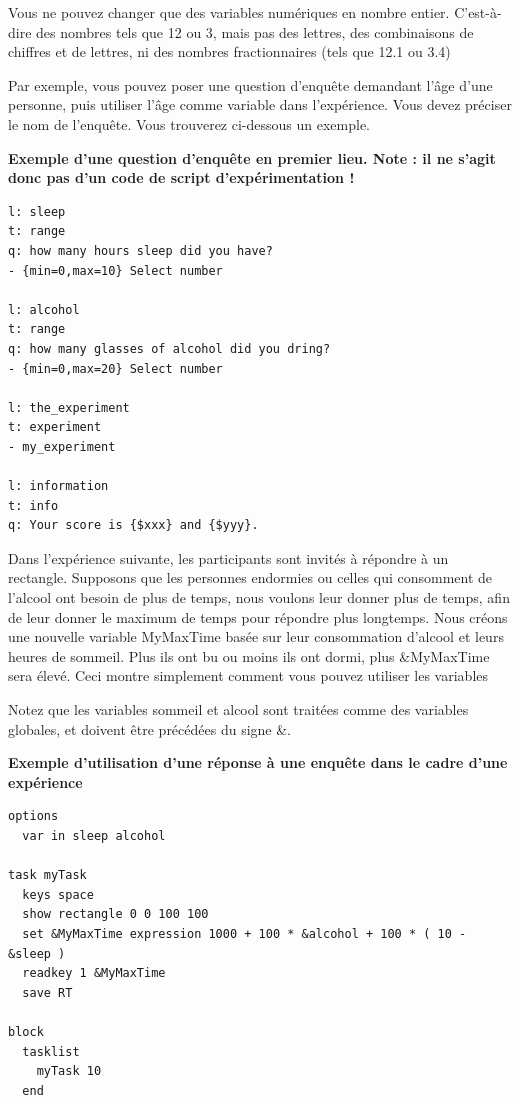 \documentclass[
]{book}
\begin{document}
Vous ne pouvez changer que des variables numériques en nombre entier.
C'est-à-dire des nombres tels que 12 ou 3, mais pas des lettres, des
combinaisons de chiffres et de lettres, ni des nombres fractionnaires
(tels que 12.1 ou 3.4)

Par exemple, vous pouvez poser une question d'enquête demandant l'âge
d'une personne, puis utiliser l'âge comme variable dans l'expérience.
Vous devez préciser le nom de l'enquête. Vous trouverez ci-dessous un
exemple.

\textbf{Exemple d'une question d'enquête en premier lieu. Note : il ne
s'agit donc pas d'un code de script d'expérimentation !}

\begin{verbatim}
l: sleep
t: range
q: how many hours sleep did you have?
- {min=0,max=10} Select number

l: alcohol
t: range
q: how many glasses of alcohol did you dring?
- {min=0,max=20} Select number

l: the_experiment
t: experiment
- my_experiment

l: information
t: info
q: Your score is {$xxx} and {$yyy}.
\end{verbatim}

Dans l'expérience suivante, les participants sont invités à répondre à
un rectangle. Supposons que les personnes endormies ou celles qui
consomment de l'alcool ont besoin de plus de temps, nous voulons leur
donner plus de temps, afin de leur donner le maximum de temps pour
répondre plus longtemps. Nous créons une nouvelle variable MyMaxTime
basée sur leur consommation d'alcool et leurs heures de sommeil. Plus
ils ont bu ou moins ils ont dormi, plus \&MyMaxTime sera élevé. Ceci
montre simplement comment vous pouvez utiliser les variables

Notez que les variables sommeil et alcool sont traitées comme des
variables globales, et doivent être précédées du signe \&.

\textbf{Exemple d'utilisation d'une réponse à une enquête dans le cadre
d'une expérience}

\begin{verbatim}
options
  var in sleep alcohol

task myTask
  keys space
  show rectangle 0 0 100 100
  set &MyMaxTime expression 1000 + 100 * &alcohol + 100 * ( 10 - &sleep )
  readkey 1 &MyMaxTime
  save RT

block
  tasklist
    myTask 10
  end
\end{verbatim}
\end{document}
